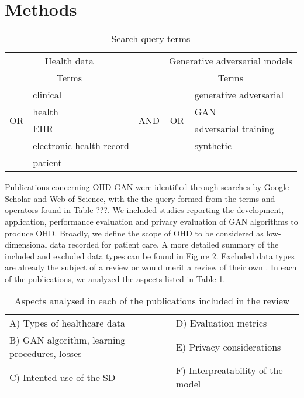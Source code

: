 \section{Methods}

\begin{table}[h]
  \center
    \begin{tabular}{@{}clccl@{}} \toprule
	    \multicolumn{2}{c}{Health data} & & \multicolumn{2}{c}{Generative adversarial models} \\ \cmidrule{1-2} \cmidrule{4-5}
	    \multicolumn{2}{c}{Terms} & {} & \multicolumn{2}{c}{Terms} \\ \cmidrule{2-2} \cmidrule{5-5}
	    \multirow{4}{*}{OR} & clinical & \multirow[t]{4}{*}{\quad AND\quad} & \multirow{4}{*}{OR} & generative adversarial\\
	    {} & health & {} & {} & GAN \\ 
	    {} & EHR & {} & {} & adversarial training \\
	    {} & electronic health record & {} & {} & synthetic  \\
	    {} & patient & {} & {} & {} \\
	    \bottomrule
    \end{tabular}
    \caption{{Search query terms}}\label{tab:search}
\end{table}

Publications concerning OHD-GAN were identified through searches by Google Scholar and Web of Science, with the the query formed from the terms and operators found in Table ???. We included studies reporting the development, application, performance evaluation and privacy evaluation of GAN algorithms to produce OHD. Broadly, we define the scope of OHD to be considered as low-dimensional data recorded for patient care. A more detailed summary of the included and excluded data types can be found in Figure 2. Excluded data types are already the subject of a review or would merit a review of their own \cite{Yi_2019}\cite{Nakata2019}\cite{Anwar_2018}. In each of the publications, we analyzed the aspects listed in Table \ref{tab:search}.\par

\begin{table}
\centering
  \caption{Aspects analysed in each of the publications included in the review\label{tab:aspects}}
  \begin{tabular}{ll}\toprule
  A) Types of healthcare data & D) Evaluation metrics\\
  B) GAN algorithm, learning procedures, losses & E) Privacy considerations\\
  C) Intented use of the SD & F) Interpreatability of the model\\\bottomrule
  \end{tabular}
\end{table}

